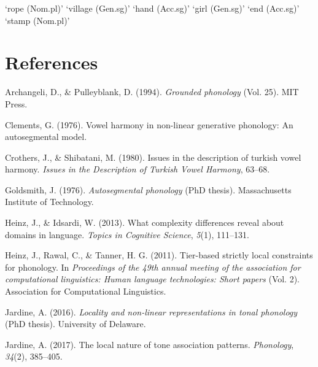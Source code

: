 \documentclass[floatsintext,man]{apa6}
\theoremstyle{definition}
\theoremstyle{definition}
\theoremstyle{definition}
\theoremstyle{remark}
\begin{document}
\begin{exe}
\label{turkish_back}
\begin{xlist}
  \ex {} `rope (Nom.pl)'
  \ex {} `village (Gen.sg)'
  \ex {}   `hand (Acc.sg)'
  \ex {} `girl (Gen.sg)'
  \ex {}  `end (Acc.sg)'
  \ex {} `stamp (Nom.pl)'
\end{xlist}
\end{exe}

\newpage

\section{References}\label{references}

\setlength{\parindent}{-0.5in} \setlength{\leftskip}{0.5in}

\hypertarget{refs}{}
\hypertarget{ref-archangelipulleyblank1994}{}
Archangeli, D., \& Pulleyblank, D. (1994). \emph{Grounded phonology}
(Vol. 25). MIT Press.

\hypertarget{ref-Clements1976}{}
Clements, G. (1976). Vowel harmony in non-linear generative phonology:
An autosegmental model.

\hypertarget{ref-crothersshibatani1980}{}
Crothers, J., \& Shibatani, M. (1980). Issues in the description of
turkish vowel harmony. \emph{Issues in the Description of Turkish Vowel
Harmony}, 63--68.

\hypertarget{ref-Goldsmith1976}{}
Goldsmith, J. (1976). \emph{Autosegmental phonology} (PhD thesis).
Massachusetts Institute of Technology.

\hypertarget{ref-heinzidsardi2013}{}
Heinz, J., \& Idsardi, W. (2013). What complexity differences reveal
about domains in language. \emph{Topics in Cognitive Science},
\emph{5}(1), 111--131.

\hypertarget{ref-heinzetaltsl}{}
Heinz, J., Rawal, C., \& Tanner, H. G. (2011). Tier-based strictly local
constraints for phonology. In \emph{Proceedings of the 49th annual
meeting of the association for computational linguistics: Human language
technologies: Short papers} (Vol. 2). Association for Computational
Linguistics.

\hypertarget{ref-jardinediss}{}
Jardine, A. (2016). \emph{Locality and non-linear representations in
tonal phonology} (PhD thesis). University of Delaware.

\hypertarget{ref-jardinelocaltone}{}
Jardine, A. (2017). The local nature of tone association patterns.
\emph{Phonology}, \emph{34}(2), 385--405.
\end{document}
